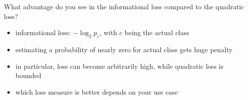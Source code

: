 \documentclass[12pt]{article}
\begin{document}
\begin{question}
	What advantage do you see in the informational loss compared to the quadratic loss?
\end{question}

\begin{itemize}[left=0pt, nosep]
	\item informational loss: $-\log_2 p_c$, with $c$ being the actual class
	\item estimating a probability of nearly zero for actual class gets huge penalty
	\item in particular, loss can become arbitrarily high, while quadratic loss is bounded
	\item which loss measure is better depends on your use case
\end{itemize}
\end{document}
